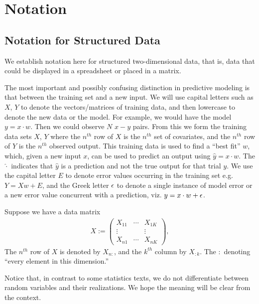 \chapter{Notation}
\label{chapter:notation}
\begin{center}
\end{center}
\vspace{0.2in}


\section{Notation for Structured Data}
We establish notation here for structured two-dimensional data, that is, data that could be displayed in a spreadsheet or placed in a matrix.  

The most important and possibly confusing distinction in predictive modeling is that between the training set and a new input.  We will use capital letters such as $X$, $Y$ to denote the vectors/matrices of training data, and then lowercase to denote the new data or the model.  For example, we would have the model $y = x\cdot w$.  Then we could observe $N$ $x-y$ pairs.  From this we form the training data sets $X$, $Y$ where the $n^{th}$ row of $X$ is the $n^{th}$ set of covariates, and the $n^{th}$ row of $Y$ is the $n^{th}$ observed output.  This training data is used to find a ``best fit'' $w$, which, given a new input $x$, can be used to predict an output using $\hat y = x\cdot w$.  The $\hat \cdot$ indicates that $\hat y$ is a prediction and not the true output for that trial $y$.  We use the capital letter $E$ to denote error values occurring in the training set e.g. $Y = X w + E$, and the Greek letter ${\epsilon}$ to denote a single instance of model error or a new error value concurrent with a prediction, viz. $y = x\cdot w + {\epsilon}$.

Suppose we have a data matrix
\begin{align*}
  X := \left( 
  \begin{matrix}
    X_{11} & \cdots & X_{1K}\\
    \vdots &   & \vdots\\
    X_{n1} & \cdots & X_{nK}
  \end{matrix}
  \right),
\end{align*}
The $n^{th}$ row of $X$ is denoted by $X_{n:}$, and the $k^{th}$ column by $X_{:k}$.  The $:$ denoting ``every element in this dimension.'' 

Notice that, in contrast to some statistics texts, we do not differentiate between random variables and their realizations.  We hope the meaning will be clear from the context.
